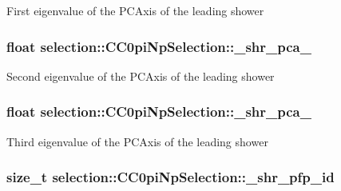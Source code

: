 First eigenvalue of the P\-C\-Axis of the leading shower \hypertarget{classselection_1_1CC0piNpSelection_ae3ce85b9e7002cfac57e433ee131868d}{
\subsubsection[{\-\_\-shr\-\_\-pca\-\_\-1}]{\setlength{\rightskip}{0pt plus 5cm}float selection\-::\-C\-C0pi\-Np\-Selection\-::\-\_\-shr\-\_\-pca\-\_\hspace{0.3cm}{\ttfamily [private]}}}\label{classselection_1_1CC0piNpSelection_ae3ce85b9e7002cfac57e433ee131868d}
Second eigenvalue of the P\-C\-Axis of the leading shower \hypertarget{classselection_1_1CC0piNpSelection_a7e5a1ac6cd32eec7da00eb45c49df0cd}{
\subsubsection[{\-\_\-shr\-\_\-pca\-\_\-2}]{\setlength{\rightskip}{0pt plus 5cm}float selection\-::\-C\-C0pi\-Np\-Selection\-::\-\_\-shr\-\_\-pca\-\_\hspace{0.3cm}{\ttfamily [private]}}}\label{classselection_1_1CC0piNpSelection_a7e5a1ac6cd32eec7da00eb45c49df0cd}
Third eigenvalue of the P\-C\-Axis of the leading shower \hypertarget{classselection_1_1CC0piNpSelection_a21f98860ef8bd0ad8d8e029a47ef6f1e}{
\subsubsection[{\-\_\-shr\-\_\-pfp\-\_\-id}]{\setlength{\rightskip}{0pt plus 5cm}size\-\_\-t selection\-::\-C\-C0pi\-Np\-Selection\-::\-\_\-shr\-\_\-pfp\-\_\-id\hspace{0.3cm}{\ttfamily [private]}}}\label{classselection_1_1CC0piNpSelection_a21f98860ef8bd0ad8d8e029a47ef6f1e}
